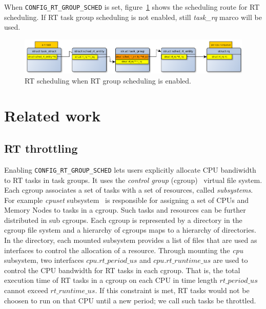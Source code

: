 When \texttt{CONFIG\_RT\_GROUP\_SCHED} is set, figure~\ref{fig:rt_routing_tg} 
shows the scheduling route for RT scheduling. If RT task group scheduling is 
not enabled, still \emph{task\_rq} marco will be used.
\begin{figure}[htbp]
        \centering
        \includegraphics[width=\textwidth]{images/rt_scheduling_scheme_tg}
        \caption{RT scheduling when RT group scheduling is enabled.}
        \label{fig:rt_routing_tg}
\end{figure}

\section{Related work\label{sec:RelatedWork}}

\subsection{RT throttling\label{sec:RelatedWork_RT}~\cite{rt-throttling}}

Enabling \texttt{CONFIG\_RT\_GROUP\_SCHED} lets users explicitly allocate
CPU bandiwidth to RT tasks in task groups. It uses the \emph{control group}
(cgroup)~\cite{cgroups} virtual file system. Each cgroup associates a set of 
tasks with a set of resources, called \emph{subsystems}. For example 
\emph{cpuset} subsystem~\cite{cpusets} is responsible for assigning a 
set of CPUs and 
Memory Nodes to tasks in a cgroup. Such tasks and resources can be further 
distributed in sub cgroups. Each cgroup is represented by a directory in 
the cgroup file 
system and a hierarchy of cgroups maps to a hierarchy of directories. In 
the directory, each mounted subsystem provides a list of files that are used 
as interfaces to control the allocation of a resource.
Through mounting the \emph{cpu} subsystem, two interfaces $cpu.rt\_period\_us$ 
and $cpu.rt\_runtime\_us$ are used to control the CPU bandwidth for RT 
tasks in each cgroup. That is, the total execution time of RT tasks in a cgroup 
on each CPU in time length $rt\_period\_us$ cannot exceed $rt\_runtime\_us$. 
If this constraint is met, RT tasks would not be choosen to run on that CPU 
until a new period; we call such tasks be throttled.

